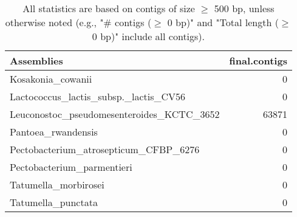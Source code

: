 \documentclass[12pt,a4paper]{article}
\begin{document}
\begin{table}[ht]
\begin{center}
\caption{All statistics are based on contigs of size $\geq$ 500 bp, unless otherwise noted (e.g., "\# contigs ($\geq$ 0 bp)" and "Total length ($\geq$ 0 bp)" include all contigs).}
\begin{tabular}{|l*{1}{|r}|}
\hline
Assemblies & final.contigs \\ \hline
Kosakonia\_cowanii & 0 \\ \hline
Lactococcus\_lactis\_subsp.\_lactis\_CV56 & 0 \\ \hline
Leuconostoc\_pseudomesenteroides\_KCTC\_3652 & 63871 \\ \hline
Pantoea\_rwandensis & 0 \\ \hline
Pectobacterium\_atrosepticum\_CFBP\_6276 & 0 \\ \hline
Pectobacterium\_parmentieri & 0 \\ \hline
Tatumella\_morbirosei & 0 \\ \hline
Tatumella\_punctata & 0 \\ \hline
\end{tabular}
\end{center}
\end{table}
\end{document}

